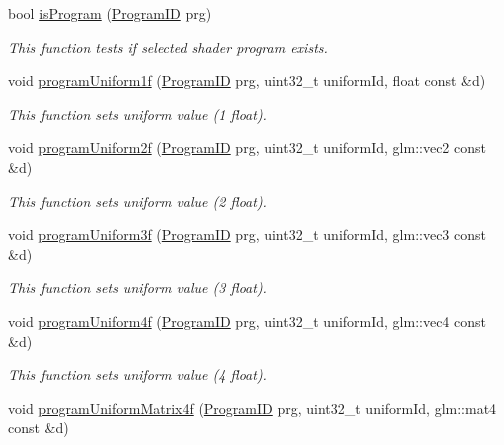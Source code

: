 \begin{DoxyCompactItemize}
bool \hyperlink{group__program__tasks_ga481c0eb5be3150af401a58fa167506e0}{is\+Program} (\hyperlink{fwd_8hpp_a46ffd067c21ab50f5f1fcfed5d8bfc15}{Program\+ID} prg)
\begin{DoxyCompactList}\small\item\em This function tests if selected shader program exists. \end{DoxyCompactList}\item 
void \hyperlink{group__program__tasks_gaa9e9717db5520e6c34a1b380d6321758}{program\+Uniform1f} (\hyperlink{fwd_8hpp_a46ffd067c21ab50f5f1fcfed5d8bfc15}{Program\+ID} prg, uint32\+\_\+t uniform\+Id, float const \&d)
\begin{DoxyCompactList}\small\item\em This function sets uniform value (1 float). \end{DoxyCompactList}\item 
void \hyperlink{group__program__tasks_gac34e13783980686c497adda156923b1d}{program\+Uniform2f} (\hyperlink{fwd_8hpp_a46ffd067c21ab50f5f1fcfed5d8bfc15}{Program\+ID} prg, uint32\+\_\+t uniform\+Id, glm\+::vec2 const \&d)
\begin{DoxyCompactList}\small\item\em This function sets uniform value (2 float). \end{DoxyCompactList}\item 
void \hyperlink{group__program__tasks_ga06b1aca1375a9cfff13d3b66defe485f}{program\+Uniform3f} (\hyperlink{fwd_8hpp_a46ffd067c21ab50f5f1fcfed5d8bfc15}{Program\+ID} prg, uint32\+\_\+t uniform\+Id, glm\+::vec3 const \&d)
\begin{DoxyCompactList}\small\item\em This function sets uniform value (3 float). \end{DoxyCompactList}\item 
void \hyperlink{group__program__tasks_gad703e87e1652a78261739c6b5108c852}{program\+Uniform4f} (\hyperlink{fwd_8hpp_a46ffd067c21ab50f5f1fcfed5d8bfc15}{Program\+ID} prg, uint32\+\_\+t uniform\+Id, glm\+::vec4 const \&d)
\begin{DoxyCompactList}\small\item\em This function sets uniform value (4 float). \end{DoxyCompactList}\item 
void \hyperlink{group__program__tasks_gac3b490a674226c0510ac3c0b784010fa}{program\+Uniform\+Matrix4f} (\hyperlink{fwd_8hpp_a46ffd067c21ab50f5f1fcfed5d8bfc15}{Program\+ID} prg, uint32\+\_\+t uniform\+Id, glm\+::mat4 const \&d)

\end{DoxyCompactItemize}

